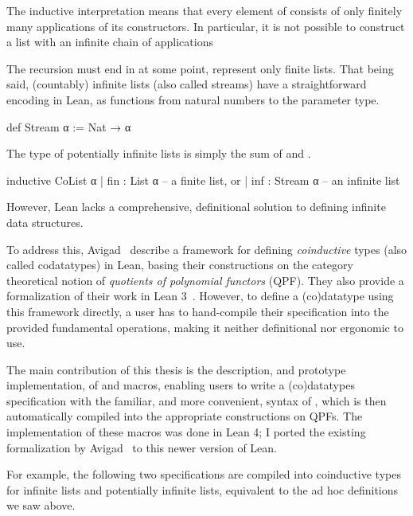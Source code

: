 The inductive interpretation means that every element of  consists of only
finitely many applications of its constructors. In particular, it is not possible
to construct a list with an infinite chain of  applications
\begin{center}
\end{center}
The recursion must end in  at some point,  represent only finite lists.
That being said, (countably) infinite lists (also called streams) have a straightforward encoding in Lean, as functions from natural numbers to the parameter type.
\begin{leancode}
    def Stream α := Nat → α
\end{leancode}

The type of potentially infinite lists is simply the sum of  and .
\begin{leancode}
  inductive CoList α
    | fin : List α      -- a finite list, or
    | inf : Stream α    -- an infinite list
\end{leancode}

However, Lean lacks a comprehensive, definitional solution to defining infinite data structures.

To address this, Avigad \etal{}\ describe a framework for defining \emph{coinductive} types (also called codatatypes) in Lean,
basing their constructions on the category theoretical notion of \emph{quotients of polynomial functors} (QPF).
They also provide a formalization of their work in Lean 3~\cite{avigadDataTypesQuotients2019a}.
However, to define a (co)datatype using this framework directly, a user has to hand-compile their specification 
into the provided fundamental operations, making it neither definitional nor ergonomic to use.

The main contribution of this thesis is the description, and prototype implementation, of \data{} and \codata{} macros, enabling users to write a (co)datatypes specification with the familiar, and more convenient, syntax of \inductive{}, which is then automatically compiled into the appropriate constructions on QPFs.
The implementation of these macros was done in Lean 4; I ported the existing formalization by Avigad \etal\ to this newer version of Lean.


For example, the following two \codata{} specifications are compiled into coinductive types for infinite lists and potentially infinite lists, equivalent to the ad hoc definitions we saw above.


